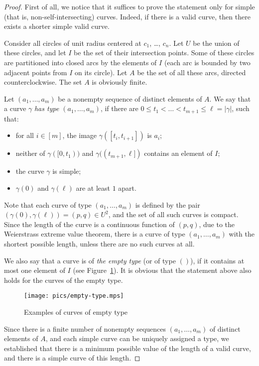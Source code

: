 \begin{proof}
First of all, we notice that it suffices to prove the statement only for simple (that is, non-self-intersecting) curves. Indeed, if there is a valid curve, then there exists a shorter simple valid curve.

Consider all circles of unit radius centered at $c_1$, \ldots, $c_n$. Let $U$ be the union of these circles, and let $I$ be the set of their intersection points. Some of these circles are partitioned into closed arcs by the elements of $I$ (each arc is bounded by two adjacent points from $I$ on its circle). Let $A$ be the set of all these arcs, directed counterclockwise. The set $A$ is obviously finite.

Let $(a_1, \ldots, a_m)$ be a nonempty sequence of distinct elements of $A$. We say that a curve $\gamma$ \emph{has type $(a_1, \ldots, a_m)$}, if there are $0 \leq t_1 < \ldots < t_{m+1} \leq \ell = |\gamma|$, such that:

\begin{itemize}
    \item for all $i\in[m]$, the image $\gamma([t_i, t_{i+1}])$ is $a_i$;
    \item neither of $\gamma([0, t_1))$ and $\gamma((t_{m+1}, \ell])$ contains an element of $I$;
    \item the curve $\gamma$ is simple;
    \item $\gamma(0)$ and $\gamma(\ell)$ are at least $1$ apart.
\end{itemize}

Note that each curve of type $(a_1, \ldots, a_m)$ is defined by the pair $(\gamma(0), \gamma(\ell)) = (p, q) \in U^2$, and the set of all such curves is compact. Since the length of the curve is a continuous function of $(p, q)$, due to the Weierstrass extreme value theorem, there is a curve of type $(a_1, \ldots, a_m)$ with the shortest possible length, unless there are no such curves at all.

We also say that a curve is of \emph{the empty type} (or of type $()$), if it contains at most one element of $I$ (see Figure~\ref{fig:emptytype}). It is obvious that the statement above also holds for the curves of the empty type.

\begin{figure}[h!]
    \centering
    \texttt{[image: pics/empty-type.mps]}
    \caption{Examples of curves of empty type}
    \label{fig:emptytype}
\end{figure}

Since there is a finite number of nonempty sequences $(a_1, \ldots, a_m)$ of distinct elements of $A$, and each simple curve can be uniquely assigned a type, we established that there is a minimum possible value of the length of a valid curve, and there is a simple curve of this length.
\end{proof}

